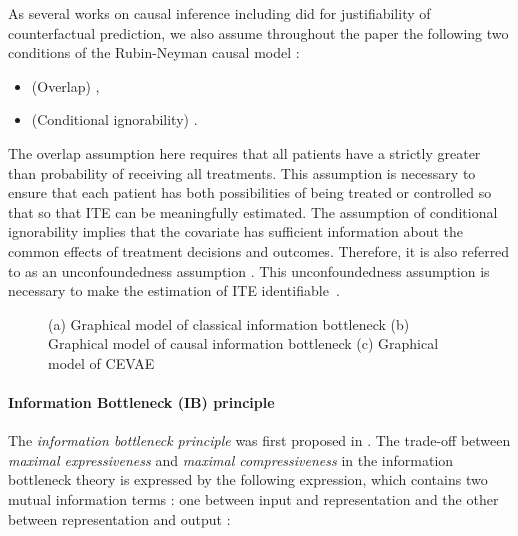 \documentclass{article}
\begin{document}
As several works on causal inference including \cite{johansson16, Shalit17, yao2018} did for justifiability of counterfactual prediction, we also assume throughout the paper the following two conditions of the Rubin-Neyman causal model \cite{Rubin1974, Shalit17}:
    \begin{itemize}
        \item (Overlap) ,
        \item (Conditional ignorability) .
    \end{itemize}
    The overlap assumption here requires that all patients have a strictly greater than  probability of receiving all treatments. This assumption is necessary to ensure that each patient has both possibilities of being treated or controlled so that so that ITE can be meaningfully estimated. The assumption of conditional ignorability implies that the covariate has sufficient information about the common effects of treatment decisions and outcomes. Therefore, it is also referred to as an unconfoundedness assumption \cite{Rubin2005}. This unconfoundedness assumption is necessary to make the estimation of ITE identifiable~\cite{Rubin15}.
    


\begin{figure}[t]
	\centering
 	 \vspace{-.2cm}\caption{(a) Graphical model of classical information bottleneck (b) Graphical model of causal information bottleneck (c) Graphical model of CEVAE~\cite{Louizos17} } 
 	\label{fig:graphical_model}
\end{figure}


\paragraph{Information Bottleneck (IB) principle}    
    The \textit{information bottleneck principle} was first proposed in \cite{Tishby99}. The trade-off between \textit{maximal expressiveness} and \textit{maximal compressiveness} in the information bottleneck theory is expressed by the following expression, which contains two mutual information terms : one between input  and representation  and the other between representation  and output :
  
\end{document}
